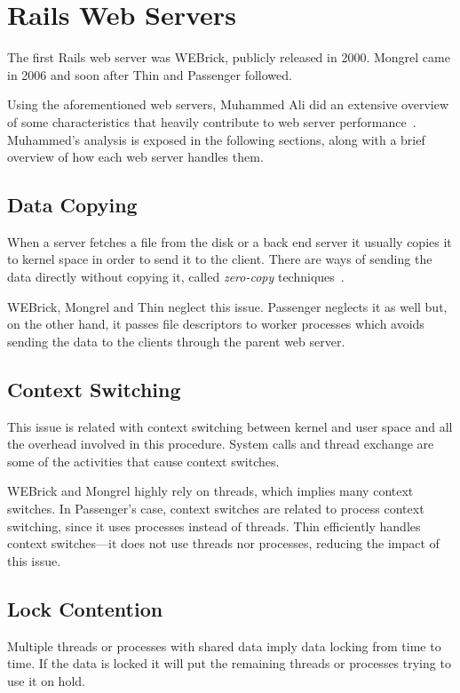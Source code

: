 \section{Rails Web Servers} %
\label{state:sec:rails_web_servers}
The first Rails web server was WEBrick, publicly released in 2000. Mongrel came in 2006 and soon after Thin and Passenger followed.

Using the aforementioned web servers, Muhammed Ali did an extensive overview of some characteristics that heavily contribute to web server performance~\cite{ruby_webservers}. Muhammed's analysis is exposed in the following sections, along with a brief overview of how each web server handles them.

\subsection{Data Copying}
When a server fetches a file from the disk or a back end server it usually copies it to kernel space in order to send it to the client. There are ways of sending the data directly without copying it, called \textit{zero-copy} techniques~\cite{ zero-copy_data_transfer}.

WEBrick, Mongrel and Thin neglect this issue. Passenger neglects it as well but, on the other hand, it passes file descriptors to worker processes which avoids sending the data to the clients through the parent web server.

\subsection{Context Switching}
This issue is related with context switching between kernel and user space and all the overhead involved in this procedure. System calls and thread exchange are some of the activities that cause context switches.

WEBrick and Mongrel highly rely on threads, which implies many context switches. In Passenger's case, context switches are related to process context switching, since it uses processes instead of threads. Thin efficiently handles context switches---it does not use threads nor processes, reducing the impact of this issue.

\subsection{Lock Contention} 
Multiple threads or processes with shared data imply data locking from time to time. If the data is locked it will put the remaining threads or processes trying to use it on hold.

